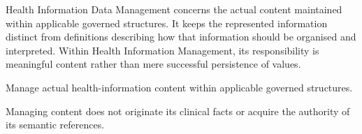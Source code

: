 Health Information Data Management concerns the actual content maintained within applicable governed structures. It keeps the represented information distinct from definitions describing how that information should be organised and interpreted. Within Health Information Management, its responsibility is meaningful content rather than mere successful persistence of values.



Manage actual health-information content within applicable governed structures.



Managing content does not originate its clinical facts or acquire the authority of its semantic references.


